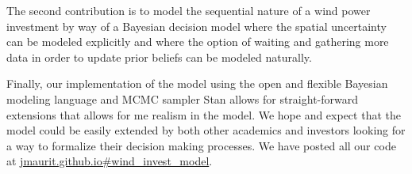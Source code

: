 \documentclass[11pt]{article}
\begin{document}
The second contribution is to model the sequential nature of a wind power investment by way of a Bayesian decision model where the spatial uncertainty can be modeled explicitly and where the option of waiting and gathering more data in order to update prior beliefs can be modeled naturally. 

Finally, our implementation of the model using the open and flexible Bayesian modeling language and MCMC sampler Stan allows for straight-forward extensions that allows for me realism in the model. We hope and expect that the model could be easily extended by both other academics and investors looking for a way to formalize their decision making processes.  We have posted all our code at \url{jmaurit.github.io#wind_invest_model}.
 
\begin{spacing}{1}


\end{spacing}
\end{document}
